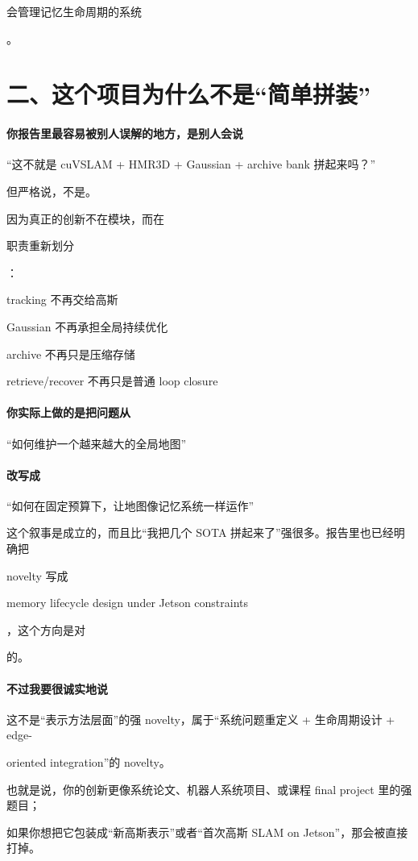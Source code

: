 \documentclass[12pt]{article}
\begin{document}
会管理记忆生命周期的系统

。

\section{二、这个项目为什么不是“简单拼装”}
\paragraph{你报告里最容易被别人误解的地方，是别人会说}
“这不就是 cuVSLAM + HMR3D + Gaussian + archive bank 拼起来吗？”

但严格说，不是。

因为真正的创新不在模块，而在

职责重新划分

：

tracking 不再交给高斯

Gaussian 不再承担全局持续优化

archive 不再只是压缩存储

retrieve/recover 不再只是普通 loop closure

\paragraph{你实际上做的是把问题从}
“如何维护一个越来越大的全局地图”

\paragraph{改写成}
“如何在固定预算下，让地图像记忆系统一样运作”

这个叙事是成立的，而且比“我把几个 SOTA 拼起来了”强很多。报告里也已经明确把

novelty 写成

memory lifecycle design under Jetson constraints

，这个方向是对

的。

\paragraph{不过我要很诚实地说}
这不是“表示方法层面”的强 novelty，属于“系统问题重定义 + 生命周期设计 + edge-

oriented integration”的 novelty。

也就是说，你的创新更像系统论文、机器人系统项目、或课程 final project 里的强题目；

如果你想把它包装成“新高斯表示”或者“首次高斯 SLAM on Jetson”，那会被直接打掉。
\end{document}
